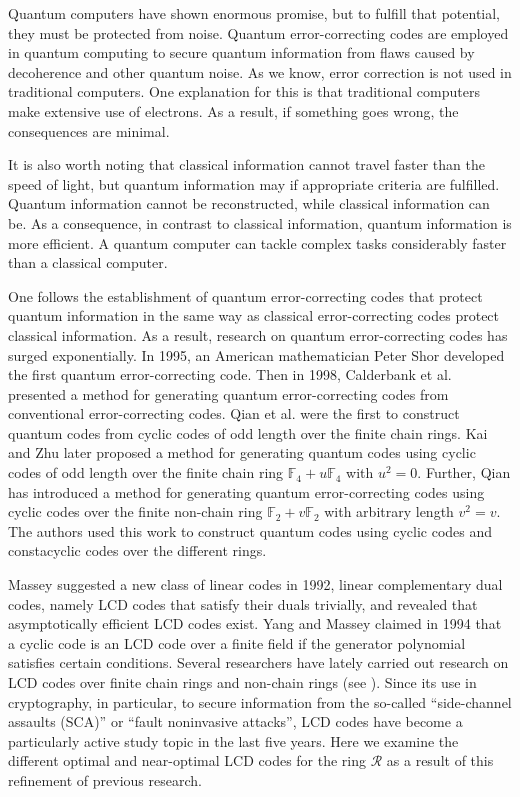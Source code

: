 \documentclass[12pt]{article}
\begin{document}
Quantum computers have shown enormous promise, but to fulfill that potential, they must be protected from noise. Quantum error-correcting codes are employed in quantum computing to secure quantum information from flaws caused by decoherence and other quantum noise. As we know, error correction is not used in traditional computers. One explanation for this is that traditional computers make extensive use of electrons. As a result, if something goes wrong, the consequences are minimal.

It is also worth noting that classical information cannot travel faster than the speed of light, but quantum information may if appropriate criteria are fulfilled. Quantum information cannot be reconstructed, while classical information can be. As a consequence, in contrast to classical information, quantum information is more efficient. A quantum computer can tackle complex tasks considerably faster than a classical computer.


One follows the establishment of quantum error-correcting codes that protect quantum information in the same way as classical error-correcting codes protect classical information. As a result, research on quantum error-correcting codes has surged exponentially. In 1995, an American mathematician Peter Shor \cite{25} developed the first quantum error-correcting code. Then in 1998, Calderbank et al. \cite{4} presented a method for generating quantum error-correcting codes from conventional error-correcting codes. Qian et al. \cite{17} were the first to construct quantum codes from cyclic codes of odd length over the finite chain rings. Kai and Zhu \cite{29} later proposed a method for generating quantum codes using cyclic codes of odd length over the finite chain ring $\mathbb{F}_4 + u\mathbb{F}_4$ with $u^2 = 0$. Further, Qian \cite{18} has introduced a method for generating quantum error-correcting codes using cyclic codes over the finite non-chain ring $\mathbb{F}_2 + v\mathbb{F}_2$ with arbitrary length $v^2 = v$. The authors \cite{2,12,13,19,20,26} used this work to construct quantum codes using cyclic codes and constacyclic codes over the different rings.

Massey \cite{16} suggested a new class of linear codes in 1992, linear complementary dual codes, namely LCD codes that satisfy their duals trivially, and revealed that asymptotically efficient LCD codes exist. Yang and Massey \cite{28} claimed in 1994 that a cyclic code is an LCD code over a finite field if the generator polynomial satisfies certain conditions. Several researchers have lately carried out research on LCD codes over finite chain rings and non-chain rings (see \cite{8,10,11,30,31}). Since its use in cryptography, in particular, to secure information from the so-called ``side-channel assaults (SCA)'' or ``fault noninvasive attacks'', LCD codes have become a particularly active study topic in the last five years. Here we examine the different optimal and near-optimal LCD codes for the ring $\mathcal{R}$ as a result of this refinement of previous research.
\end{document}
